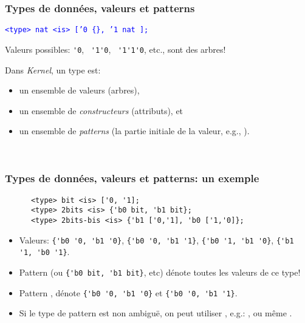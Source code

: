 \documentclass{beamer}
\newcommand{\mypause}{\pause}
\newcommand{\Kernel}{\textit{Kernel}}
\begin{document}
\begin{frame}[fragile]
  \frametitle{Types de données, valeurs et patterns}\small
  \textcolor{blue}{\texttt{<type> nat <is> ['0 \{\}, '1 nat ];}}
  \begin{center}
          
  \end{center} \mypause 
  {\footnotesize Valeurs possibles: {\color{blue}\verb+'0+},~ {\color{blue}\verb+'1'0+},~
    {\color{blue}\verb+'1'1'0+}, etc.\mypause, sont des \alert{arbres}!}\\[0.4cm]
  
  \mypause 
  
  Dans \Kernel{}, un \og\alert{type}\fg{} est:\footnotesize
  \begin{itemize}
  \item un ensemble de valeurs (arbres),
  \item un ensemble de \emph{constructeurs} (attributs), et
  \item un ensemble de \emph{patterns} (la partie initiale de la valeur, e.g., \fg{}).
  \end{itemize} ~
\end{frame}

\begin{frame}[fragile]
  \frametitle{Types de données, valeurs et patterns: un exemple}
  {\footnotesize\color{blue}
\begin{verbatim}
      <type> bit <is> ['0, '1];
      <type> 2bits <is> {'b0 bit, 'b1 bit};
      <type> 2bits-bis <is> {'b1 ['0,'1], 'b0 ['1,'0]};
\end{verbatim} 
  }\small
  \begin{itemize}
  \item Valeurs: \mypause 
{\color{blue}\verb+{'b0 '0, 'b1 '0}+}, \mypause 
{\color{blue}\verb+{'b0 '0, 'b1 '1}+}, \mypause
{\color{blue}\verb+{'b0 '1, 'b1 '0}+}, \mypause
{\color{blue}\verb+{'b1 '1, 'b0 '1}+}. 

\mypause
\footnotesize
\item Pattern \fg{} (ou {\color{blue}\verb+{'b0 bit, 'b1 bit}+}, etc) 
  \mypause
  dénote toutes les valeurs de ce type!
  \mypause
\item Pattern 
  \fg{}\mypause, dénote
  {\color{blue}\verb+{'b0 '0, 'b1 '0}+} et
  {\color{blue}\verb+{'b0 '0, 'b1 '1}+}.
\mypause
\item Si le type de pattern est non ambiguë, on peut utiliser \fg, e.g.: 
 \fg, ou même  \fg.
\end{itemize}


\end{frame}
\end{document}
